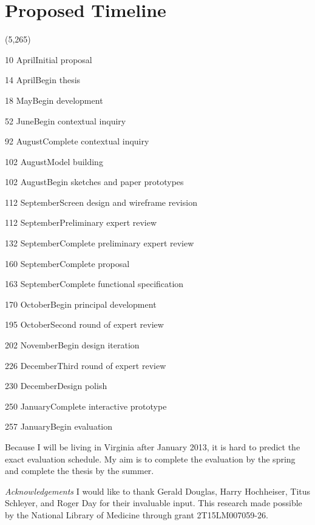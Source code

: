 \documentclass[11pt]{article}
\begin{document}
\section{Proposed Timeline}

\begin{timeline}{4.2in}(5,265)
\optrule
  \item[10]{April}{Initial proposal}
  \item[14]{April}{Begin thesis}
  \item[18]{May}{Begin development}
  \item[52]{June}{Begin contextual inquiry}
  \item[92]{August}{Complete contextual inquiry}
  \item[102]{August}{Model building}
  \item[102]{August}{Begin sketches and paper prototypes}
  \item[112]{September}{Screen design and wireframe revision}
  \item[112]{September}{Preliminary expert review}
  \item[132]{September}{Complete preliminary expert review}
  \item[160]{September}{Complete proposal}
  \item[163]{September}{Complete functional specification}
  \item[170]{October}{Begin principal development}
  \item[195]{October}{Second round of expert review}
  \item[202]{November}{Begin design iteration}
  \item[226]{December}{Third round of expert review}
  \item[230]{December}{Design polish}
  \item[250]{January}{Complete interactive prototype}
  \item[257]{January}{Begin evaluation}
\end{timeline}%

\noindent Because I will be living in Virginia after January 2013, it is hard to predict the exact evaluation schedule. My aim is to complete the evaluation by the spring and complete the thesis by the summer.

\vspace{20pt}

\noindent \textit{Acknowledgements} I would like to thank Gerald Douglas, Harry Hochheiser, Titus Schleyer, and Roger Day for their invaluable input. This research made possible by the National Library of Medicine through grant 2T15LM007059-26.
\newpage
\end{document}
